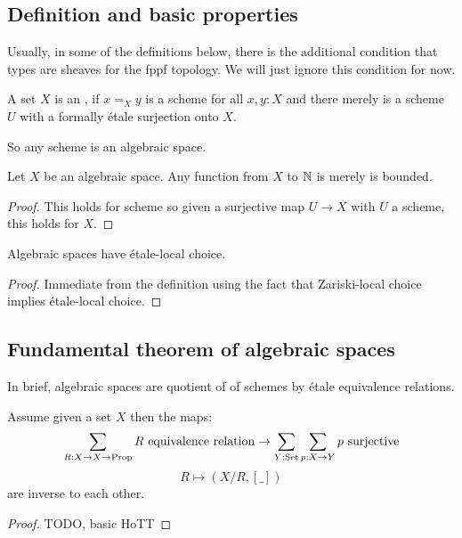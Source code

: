 \subsection{Definition and basic properties}

Usually, in some of the definitions below,
there is the additional condition that types are sheaves for the fppf topology.
We will just ignore this condition for now.

\begin{definition}
  A set $X$ is an ,
  if $x=_Xy$ is a scheme for all $x,y:X$ and
  there merely is a scheme $U$ with a formally étale surjection onto $X$.
\end{definition}

So any scheme is an algebraic space.

\begin{lemma}
Let $X$ be an algebraic space. Any function from $X$ to $\mathbb{N}$ is merely is bounded.
\end{lemma}

\begin{proof}
This holds for scheme so given a surjective map $U\to X$ with $U$ a scheme, this holds for $X$.
\end{proof}

\begin{lemma}
Algebraic spaces have étale-local choice.
\end{lemma}

\begin{proof}
Immediate from the definition using the fact that Zariski-local choice implies étale-local choice.
\end{proof}

\subsection{Fundamental theorem of algebraic spaces}

In brief, algebraic spaces are quotient of of schemes by étale equivalence relations.

\begin{lemma}
Assume given a set $X$ then the maps:
\[ \sum_{R:X\to X\to \Prop} R\ \mathrm{equivalence\ relation} \to \sum_{Y:\mathrm{Set}} \sum_{p:X\to Y} p\ \mathrm{surjective}\]
\[R \mapsto (X/R,[\_])\]
are inverse to each other.
\end{lemma}

\begin{proof}
TODO, basic HoTT
\end{proof}


